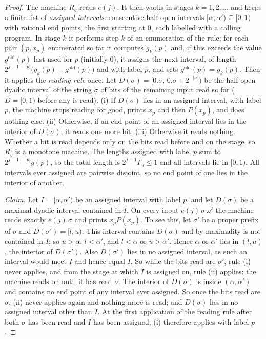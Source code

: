 \begin{proof}
The machine $R_g$ reads $\tilde e(j)$. It then works in stages $k=1,2,\dots$ and keeps a finite list of
\emph{assigned intervals}: consecutive half-open intervals $[\alpha,\alpha')\subseteq[0,1)$ with rational end
points, the first starting at $0$, each labelled with a calling program. In stage $k$ it performs step $k$ of
an enumeration of the rule; for each pair $(p,x_p)$ enumerated so far it computes $g_k(p)$ and, if this
exceeds the value $g^{\mathrm{old}}(p)$ last used for $p$ (initially $0$), it assigns the next interval, of
length $2^{j-1-|p|}\bigl(g_k(p)-g^{\mathrm{old}}(p)\bigr)$ and with label $p$, and sets
$g^{\mathrm{old}}(p)=g_k(p)$. Then it applies the \emph{reading rule} once. Let
$D(\sigma)=[0.\sigma,\,0.\sigma+2^{-|\sigma|})$ be the half-open dyadic interval of the string $\sigma$ of
bits of the remaining input read so far ($D=[0,1)$ before any is read). (i) If $D(\sigma)$ lies in an assigned
interval, with label $p$, the machine stops reading for good, prints $x_p$ and then $P(x_p)$, and does nothing
else. (ii) Otherwise, if an end point of an assigned interval lies in the interior of $D(\sigma)$, it reads
one more bit. (iii) Otherwise it reads nothing. Whether a bit is read depends only on the bits read before and
on the stage, so $R_g$ is a monotone machine. The lengths assigned with label $p$ sum to $2^{j-1-|p|}g(p)$, so
the total length is $2^{j-1}\Gamma_g\le1$ and all intervals lie in $[0,1)$. All intervals ever assigned are
pairwise disjoint, so no end point of one lies in the interior of another.

\emph{Claim.} Let $I=[\alpha,\alpha')$ be an assigned interval with label $p$, and let $D(\sigma)$ be a
maximal dyadic interval contained in $I$. On every input $\tilde e(j)\,\sigma\,\omega'$ the machine reads
exactly $\tilde e(j)\,\sigma$ and prints $x_pP(x_p)$. To see this, let $\sigma'$ be a proper prefix of
$\sigma$ and $D(\sigma')=[l,u)$. This interval contains $D(\sigma)$ and by maximality is not contained in $I$;
so $u>\alpha$, $l<\alpha'$, and $l<\alpha$ or $u>\alpha'$. Hence $\alpha$ or $\alpha'$ lies in $(l,u)$, the
interior of $D(\sigma')$. Also $D(\sigma')$ lies in no assigned interval, as such an interval would meet $I$
and hence equal $I$. So while the bits read are $\sigma'$, rule (i) never applies, and from the stage at which
$I$ is assigned on, rule (ii) applies: the machine reads on until it has read $\sigma$. The interior of
$D(\sigma)$ is inside $(\alpha,\alpha')$ and contains no end point of any interval ever assigned. So once the
bits read are $\sigma$, (ii) never applies again and nothing more is read; and $D(\sigma)$ lies in no assigned
interval other than $I$. At the first application of the reading rule after both $\sigma$ has been read and
$I$ has been assigned, (i) therefore applies with label $p$.


\end{proof}
